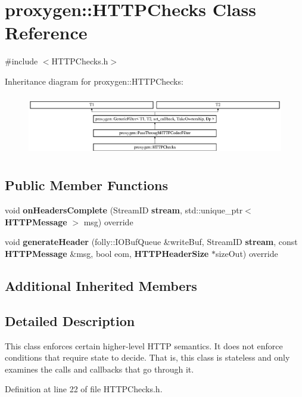 \section{proxygen\+:\+:H\+T\+T\+P\+Checks Class Reference}
\label{classproxygen_1_1HTTPChecks}


{\ttfamily \#include $<$H\+T\+T\+P\+Checks.\+h$>$}

Inheritance diagram for proxygen\+:\+:H\+T\+T\+P\+Checks\+:\begin{figure}[H]
\begin{center}
\leavevmode
\includegraphics[height=2.698795cm]{classproxygen_1_1HTTPChecks}
\end{center}
\end{figure}
\subsection*{Public Member Functions}
\begin{DoxyCompactItemize}
\item 
void {\bf on\+Headers\+Complete} (Stream\+ID {\bf stream}, std\+::unique\+\_\+ptr$<$ {\bf H\+T\+T\+P\+Message} $>$ msg) override
\item 
void {\bf generate\+Header} (folly\+::\+I\+O\+Buf\+Queue \&write\+Buf, Stream\+ID {\bf stream}, const {\bf H\+T\+T\+P\+Message} \&msg, bool eom, {\bf H\+T\+T\+P\+Header\+Size} $\ast$size\+Out) override
\end{DoxyCompactItemize}
\subsection*{Additional Inherited Members}


\subsection{Detailed Description}
This class enforces certain higher-\/level H\+T\+TP semantics. It does not enforce conditions that require state to decide. That is, this class is stateless and only examines the calls and callbacks that go through it. 

Definition at line 22 of file H\+T\+T\+P\+Checks.\+h.



